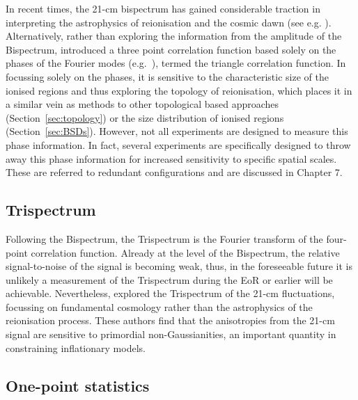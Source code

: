 In recent times, the 21-cm bispectrum has gained considerable traction in interpreting the astrophysics of reionisation and the cosmic dawn (see e.g. \cite{Bharadwaj:2005,Pillepich:2007,Yoshiura:2015,Shimabukuro:2016,Shimabukuro:2017,Watkinson:2017,Majumdar:2018,Hutter:2019,Trott:2019,Watkinson:2019}). Alternatively, rather than exploring the information from the amplitude of the Bispectrum, \cite{Gorce:2019} introduced a three point correlation function based solely on the phases of the Fourier modes (e.g.~\cite{Obreschkow:2013}), termed the triangle correlation function. In focussing solely on the phases, it is sensitive to the characteristic size of the ionised regions and thus exploring the topology of reionisation, which places it in a similar vein as methods to other topological based approaches (Section~\ref{sec:topology}) or the size distribution of ionised regions (Section~\ref{sec:BSDs}). However, not all experiments are designed to measure this phase information. In fact, several experiments are specifically designed to throw away this phase information for increased sensitivity to specific spatial scales. These are referred to redundant configurations and are discussed in Chapter 7.

\subsection{Trispectrum} \label{sec:trispectrum}

Following the Bispectrum, the Trispectrum is the Fourier transform of the four-point correlation function. Already at the level of the Bispectrum, the relative signal-to-noise of the signal is becoming weak, thus, in the foreseeable future it is unlikely a measurement of the Trispectrum during the EoR or earlier will be achievable. Nevertheless, \cite{Cooray:2008} explored the Trispectrum of the 21-cm fluctuations, focussing on fundamental cosmology rather than the astrophysics of the reionisation process. These authors find that the anisotropies from the 21-cm signal are sensitive to primordial non-Gaussianities, an important quantity in constraining inflationary models.

\subsection{One-point statistics}

